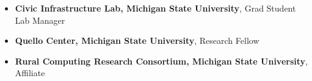  \begin{small} \color{black} 
   \begin{itemize}[noitemsep,topsep=0pt,parsep=0pt,partopsep=0pt]
   \item[]\textbf{Civic Infrastructure Lab, Michigan State University}, Grad Student Lab Manager
   \item[]\textbf{Quello Center, Michigan State University}, Research Fellow 
   \item[]\textbf{Rural Computing Research Consortium, Michigan State University}, Affiliate
\end{itemize} 
\end{small}


